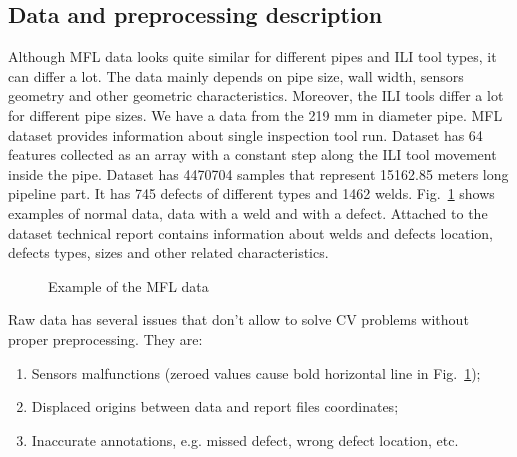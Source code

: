 \subsection{Data and preprocessing description}
Although MFL data looks quite similar for different pipes and ILI tool types, it can differ a lot.
The data mainly depends on pipe size, wall width, sensors geometry and other geometric characteristics.
Moreover, the ILI tools differ a lot for different pipe sizes.
We have a data from the 219 mm in diameter pipe.
%
MFL dataset provides information about single inspection tool run.
Dataset has 64 features collected as an array with a constant step along the ILI tool movement inside the pipe.
Dataset has 4470704 samples that represent 15162.85 meters long pipeline part.
It has 745 defects of different types and 1462 welds.
Fig.~\ref{ris:defect_example} shows examples of normal data, data with a weld and with a defect.
Attached to the dataset technical report contains information about welds and defects location, defects types, sizes and other related characteristics.
\begin{figure}[ht]
	\caption{Example of the MFL data}
	\label{ris:defect_example}
\end{figure}

Raw data has several issues that don't allow to solve CV problems without proper preprocessing.
They are:
\begin{enumerate}
	\item Sensors malfunctions (zeroed values cause bold horizontal line in Fig.~\ref{ris:defect_example});
	\item Displaced origins between data and report files coordinates;
	\item Inaccurate annotations, e.g. missed defect, wrong defect location, etc.
\end{enumerate}

